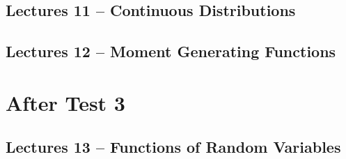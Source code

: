 \documentclass{article}
\begin{document}
\subsection{Lectures 11 -- Continuous Distributions}
\newpage

\subsection{Lectures 12 -- Moment Generating Functions}
\newpage

\section{After Test 3}

\secttoc

\subsection{Lectures 13 -- Functions of Random Variables}
\newpage
\end{document}
